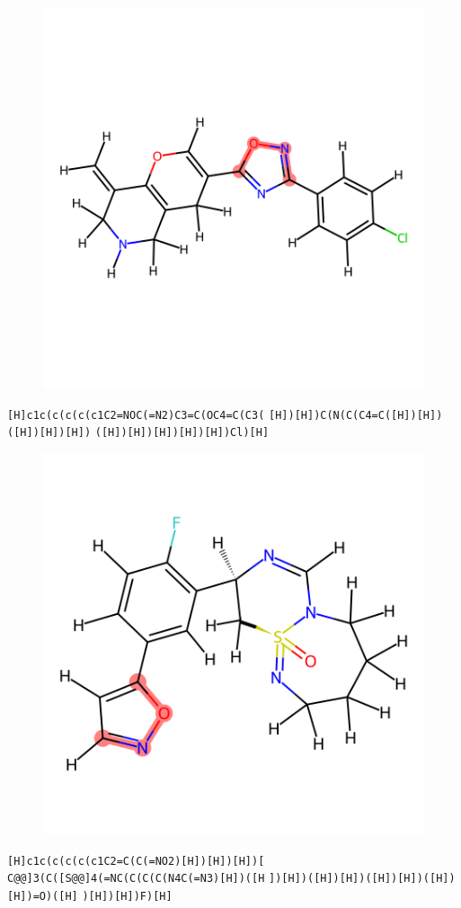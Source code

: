 \documentclass{article}
\begin{document}
\begin{figure}[ht]
\centering
    \includegraphics{mol80.png}
\end{figure}
\verb|[H]c1c(c(c(c(c1C2=NOC(=N2)C3=C(OC4=C(C3(| \verb|[H])[H])C(N(C(C4=C([H])[H])([H])[H])[H])| \verb|([H])[H])[H])[H])[H])Cl)[H]|

\begin{figure}[ht]
\centering
    \includegraphics{mol81.png}
\end{figure}
\verb|[H]c1c(c(c(c(c1C2=C(C(=NO2)[H])[H])[H])[| \verb|C@@]3(C([S@@]4(=NC(C(C(C(N4C(=N3)[H])([H| \verb|])[H])([H])[H])([H])[H])([H])[H])=O)([H]| \verb|)[H])[H])F)[H]|
\end{document}
